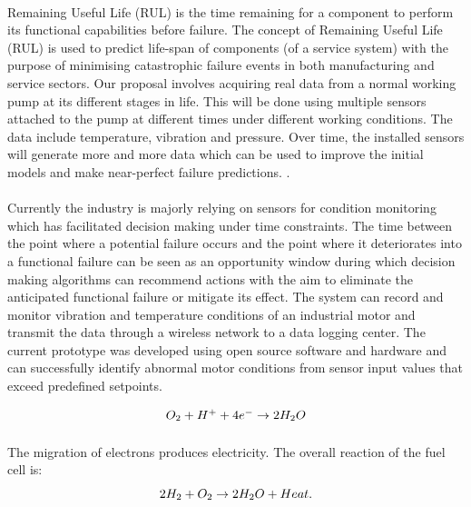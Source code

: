 \paragraph{}Remaining Useful Life (RUL) is the time remaining for a component to perform its functional capabilities before failure.
The concept of Remaining Useful Life (RUL) is used to predict life-span of components (of a service system) with the purpose of minimising catastrophic failure events in both manufacturing and service sectors. Our proposal involves acquiring real data from a normal working pump at its different stages in life. This will be done using multiple sensors attached to the pump at different times under different working conditions. The data include temperature, vibration and pressure.
Over time, the installed sensors will generate more and more data which can be used to improve the initial models and make near-perfect failure predictions.
 \cite{stefanopoulou_mechatronics_nodate}.

\paragraph{}Currently the industry is majorly relying on sensors for condition monitoring which has facilitated decision making under time constraints.
The time between the point where a potential failure occurs and the point where it deteriorates into a functional failure can be seen as an opportunity window during which decision making algorithms can recommend actions with the aim to eliminate the anticipated functional failure or mitigate its effect. The system can record and monitor vibration and temperature conditions of an industrial motor and transmit the data through a wireless network to a data logging center. The current prototype was developed using open source software and hardware and can successfully identify abnormal motor conditions from sensor input values that exceed predefined setpoints.

\begin{equation}
$$O_{2}+H^{+} + 4e^{-}\rightarrow 2H_{2}O $$
\end{equation}
\paragraph{}The migration of electrons produces electricity. The overall reaction of the fuel cell is:
\begin{equation}
$$2H_{2}+ O_{2} \rightarrow 2H_{2}O+Heat.$$
\end{equation}
